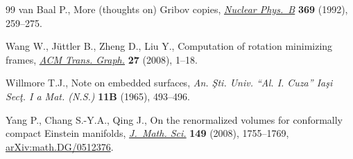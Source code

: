 \documentclass[pdftex]{sigma}
\numberwithin{equation}{section}
\renewcommand{\=}{\stackrel \Lambda =}
\begin{document}
\begin{thebibliography}{99}
van Baal P., More (thoughts on) {G}ribov copies, \href{https://doi.org/10.1016/0550-3213(92)90386-P}{\textit{Nuclear Phys.~B}}
 \textbf{369} (1992), 259--275.

Wang W., J\"uttler B., Zheng D., Liu Y., Computation of rotation minimizing
 frames, \href{https://doi.org/10.1145/1330511.1330513}{\textit{ACM Trans. Graph.}} \textbf{27} (2008), 1--18.

Willmore T.J., Note on embedded surfaces, \textit{An. \c{S}ti. Univ. ``Al. I.
 Cuza'' Ia\c{s}i Sec\c{t}. I a Mat. (N.S.)} \textbf{11B} (1965), 493--496.

Yang P., Chang S.-Y.A., Qing J., On the renormalized volumes for conformally
 compact {E}instein manifolds, \href{https://doi.org/10.1007/s10958-008-0094-0}{\textit{J.~Math. Sci.}} \textbf{149} (2008),
 1755--1769, \href{https://arxiv.org/abs/math.DG/0512376}{arXiv:math.DG/0512376}.

\end{thebibliography}\LastPageEnding
\end{document}
